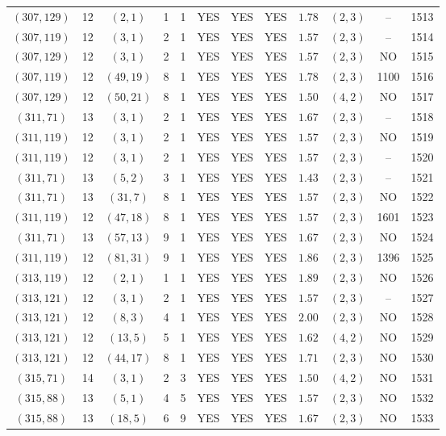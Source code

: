 \begin{longtable}{|c|c|c|c|c|c|c|c|c|c|c|c|}
$(307,129)$ & 12 & $(2,1)$ & 1 & 1 & YES & YES & YES & $1.78$ & $(2,3)$ & -- & 1513\\
$(307,119)$ & 12 & $(3,1)$ & 2 & 1 & YES & YES & YES & $1.57$ & $(2,3)$ & -- & 1514\\
$(307,129)$ & 12 & $(3,1)$ & 2 & 1 & YES & YES & YES & $1.57$ & $(2,3)$ & NO & 1515\\
$(307,119)$ & 12 & $(49,19)$ & 8 & 1 & YES & YES & YES & $1.78$ & $(2,3)$ & 1100 & 1516\\
$(307,129)$ & 12 & $(50,21)$ & 8 & 1 & YES & YES & YES & $1.50$ & $(4,2)$ & NO & 1517\\
$(311,71)$ & 13 & $(3,1)$ & 2 & 1 & YES & YES & YES & $1.67$ & $(2,3)$ & -- & 1518\\
$(311,119)$ & 12 & $(3,1)$ & 2 & 1 & YES & YES & YES & $1.57$ & $(2,3)$ & NO & 1519\\
$(311,119)$ & 12 & $(3,1)$ & 2 & 1 & YES & YES & YES & $1.57$ & $(2,3)$ & -- & 1520\\
$(311,71)$ & 13 & $(5,2)$ & 3 & 1 & YES & YES & YES & $1.43$ & $(2,3)$ & -- & 1521\\
$(311,71)$ & 13 & $(31,7)$ & 8 & 1 & YES & YES & YES & $1.57$ & $(2,3)$ & NO & 1522\\
$(311,119)$ & 12 & $(47,18)$ & 8 & 1 & YES & YES & YES & $1.57$ & $(2,3)$ & 1601 & 1523\\
$(311,71)$ & 13 & $(57,13)$ & 9 & 1 & YES & YES & YES & $1.67$ & $(2,3)$ & NO & 1524\\
$(311,119)$ & 12 & $(81,31)$ & 9 & 1 & YES & YES & YES & $1.86$ & $(2,3)$ & 1396 & 1525\\
$(313,119)$ & 12 & $(2,1)$ & 1 & 1 & YES & YES & YES & $1.89$ & $(2,3)$ & NO & 1526\\
$(313,121)$ & 12 & $(3,1)$ & 2 & 1 & YES & YES & YES & $1.57$ & $(2,3)$ & -- & 1527\\
$(313,121)$ & 12 & $(8,3)$ & 4 & 1 & YES & YES & YES & $2.00$ & $(2,3)$ & NO & 1528\\
$(313,121)$ & 12 & $(13,5)$ & 5 & 1 & YES & YES & YES & $1.62$ & $(4,2)$ & NO & 1529\\
$(313,121)$ & 12 & $(44,17)$ & 8 & 1 & YES & YES & YES & $1.71$ & $(2,3)$ & NO & 1530\\
$(315,71)$ & 14 & $(3,1)$ & 2 & 3 & YES & YES & YES & $1.50$ & $(4,2)$ & NO & 1531\\
$(315,88)$ & 13 & $(5,1)$ & 4 & 5 & YES & YES & YES & $1.57$ & $(2,3)$ & NO & 1532\\
$(315,88)$ & 13 & $(18,5)$ & 6 & 9 & YES & YES & YES & $1.67$ & $(2,3)$ & NO & 1533\\

\end{longtable}
